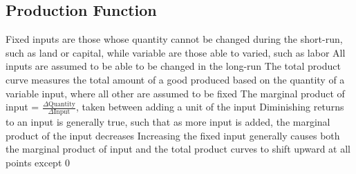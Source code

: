 \documentclass[11 pt, twoside]{article}
\newenvironment{outline*}
{
	\begin{outline}[enumerate]
	}
	{\end{outline}
}
\begin{document}
\subsection{Production Function}
\begin{outline*}
\1 Fixed inputs are those whose quantity cannot be changed during the short-run, such as land or capital, while variable are those able to varied, such as labor
\2 All inputs are assumed to be able to be changed in the long-run
\1 The total product curve measures the total amount of a good produced based on the quantity of a variable input, where all other are assumed to be fixed
\2 The marginal product of input = $\frac{\Delta \text{Quantity}}{\Delta \text{Input}}$, taken between adding a unit of the input
\2 Diminishing returns to an input is generally true, such that as more input is added, the marginal product of the input decreases
\1 Increasing the fixed input generally causes both the marginal product of input and the total product curves to shift upward at all points except 0
\end{outline*}
\end{document}
